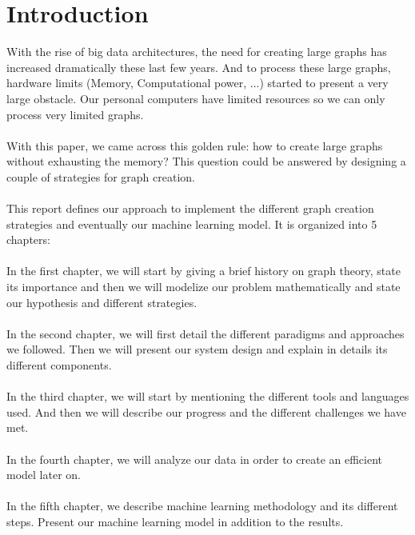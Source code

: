 \chapter*{Introduction}


With the rise of big data architectures, the need for creating large graphs has increased dramatically these last few years. And to process these large graphs, hardware limits (Memory, Computational power, ...) started to present a very large obstacle. Our personal computers have limited resources so we can only process very limited graphs.
\\
\\
With this paper, we came across this golden rule: how to create large graphs without exhausting the memory? This question could be answered by designing a couple of strategies for graph creation.
\\
\\
This report defines our approach to implement the different graph creation strategies and eventually our machine learning model. It is organized into 5 chapters:
\\
\\
In the first chapter, we will start by giving a brief history on graph theory, state its importance and then we will modelize our problem mathematically and state our hypothesis and different strategies.
\\
\\
In the second chapter, we will first detail the different paradigms and approaches we followed. Then we will present our system design and explain in details its different components.
\\
\\
In the third chapter, we will start by  mentioning the different tools and languages used. And then we will describe our progress and the different challenges we have met.
\\
\\
In the fourth chapter, we will analyze our data in order to create an efficient model later on.
\\
\\
In the fifth chapter, we describe machine learning methodology and its different steps. Present our machine learning model in addition to the results.
